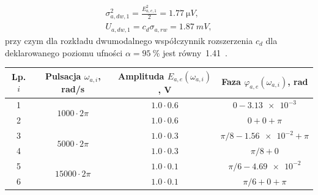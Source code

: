 \begin{gather}
\sigma_{a,dw,1}^{2} = \frac{E_{a,e,1}^{2}}{2} = \qty{1.77}{\micro V} \label{eq:sym_parta_dyn_self_var}, \\
U_{a,dw,1} = c_{d} \sigma_{a,rw} = \qty{1.87}{mV} \label{eq:sym_parta_dyn_self_unc},
\end{gather}
przy czym dla rozkładu dwumodalnego współczynnik rozszerzenia $c_{d}$ dla deklarowanego poziomu ufności $\alpha = \qty{95}{\percent}$ jest równy~\num{1.41}~\cite{jakubiec_system, jcgm_guide}.

\begin{table}[htb!]
\begin{center}
\begin{tabular}[c]{| c | c | c | c |} \hline
\textbf{Lp. $i$} & \textbf{Pulsacja $\omega_{a,i}$, rad/s} & \textbf{Amplituda $E_{a,e}(\omega_{a,i})$, V} & \textbf{Faza $\varphi_{a,e}(\omega_{a,i})$, rad} \\ \hline
1 & \multirow{2}{*}{$1000  \cdot 2\pi$} &  $\num{1.0} \cdot \num{0.6}$       & $0 - \num{3.13e-3}$            \\ \cline{1-1} \cline{3-4}
2 &                                     &  $\num{1.0} \cdot \num{0.6}$       & $0 + 0 + \pi$                  \\ \hline
3 & \multirow{2}{*}{$5000  \cdot 2\pi$} &  $\num{1.0} \cdot \num{0.3}$       & $\pi/8 - \num{1.56e-2} + \pi$  \\ \cline{1-1} \cline{3-4}
4 &                                     &  $\num{1.0} \cdot \num{0.3}$       & $\pi/8 + 0$                    \\ \hline
5 & \multirow{2}{*}{$15000 \cdot 2\pi$} &  $\num{1.0} \cdot \num{0.1}$       & $\pi/6 - \num{4.69e-2}$        \\ \cline{1-1} \cline{3-4}
6 &                                     &  $\num{1.0} \cdot \num{0.1}$       & $\pi/6 + 0 + \pi$              \\ \hline
\end{tabular}
\end{center}
\end{table}

